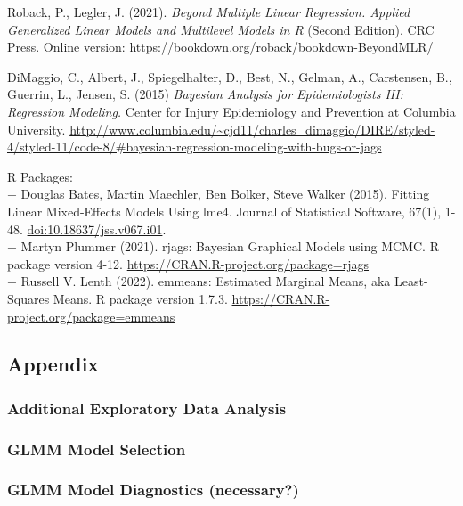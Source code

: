 \documentclass[
]{article}
\begin{document}
Roback, P., Legler, J. (2021). \emph{Beyond Multiple Linear Regression.
Applied Generalized Linear Models and Multilevel Models in R} (Second
Edition). CRC Press. Online version:
\url{https://bookdown.org/roback/bookdown-BeyondMLR/}

DiMaggio, C., Albert, J., Spiegelhalter, D., Best, N., Gelman, A.,
Carstensen, B., Guerrin, L., Jensen, S. (2015) \emph{Bayesian Analysis
for Epidemiologists III: Regression Modeling.} Center for Injury
Epidemiology and Prevention at Columbia University.
\url{http://www.columbia.edu/~cjd11/charles_dimaggio/DIRE/styled-4/styled-11/code-8/\#bayesian-regression-modeling-with-bugs-or-jags}

R Packages:\\
+ Douglas Bates, Martin Maechler, Ben Bolker, Steve Walker (2015).
Fitting Linear Mixed-Effects Models Using lme4. Journal of Statistical
Software, 67(1), 1-48. \url{doi:10.18637/jss.v067.i01}.\\
+ Martyn Plummer (2021). rjags: Bayesian Graphical Models using MCMC. R
package version 4-12. \url{https://CRAN.R-project.org/package=rjags}\\
+ Russell V. Lenth (2022). emmeans: Estimated Marginal Means, aka
Least-Squares Means. R package version 1.7.3.
\url{https://CRAN.R-project.org/package=emmeans}

\hypertarget{appendix}{%
\subsection{Appendix}\label{appendix}}

\hypertarget{additional-exploratory-data-analysis}{%
\subsubsection{Additional Exploratory Data
Analysis}\label{additional-exploratory-data-analysis}}

\hypertarget{glmm-model-selection}{%
\subsubsection{GLMM Model Selection}\label{glmm-model-selection}}

\hypertarget{glmm-model-diagnostics-necessary}{%
\subsubsection{GLMM Model Diagnostics
(necessary?)}\label{glmm-model-diagnostics-necessary}}
\end{document}
